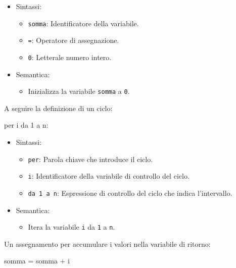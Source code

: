 \documentclass[
  letterpaper,
]{scrbook}
\newenvironment{Shaded}{\begin{snugshade}}{\end{snugshade}}
\newcommand{\NormalTok}[1]{\textcolor[rgb]{0.00,0.23,0.31}{#1}}
\providecommand{\tightlist}{%
  \setlength{\itemsep}{0pt}\setlength{\parskip}{0pt}}\usepackage{longtable,booktabs,array}
\begin{document}
\begin{itemize}
\tightlist
\item
  Sintassi:

  \begin{itemize}
  \tightlist
  \item
    \texttt{somma}: Identificatore della variabile.
  \item
    \texttt{=}: Operatore di assegnazione.
  \item
    \texttt{0}: Letterale numero intero.
  \end{itemize}
\item
  Semantica:

  \begin{itemize}
  \tightlist
  \item
    Inizializza la variabile \texttt{somma} a \texttt{0}.
  \end{itemize}
\end{itemize}

A seguire la definizione di un ciclo:

\begin{Shaded}
\begin{Highlighting}[]
\NormalTok{per i da 1 a n:}
\end{Highlighting}
\end{Shaded}

\begin{itemize}
\tightlist
\item
  Sintassi:

  \begin{itemize}
  \tightlist
  \item
    \texttt{per}: Parola chiave che introduce il ciclo.
  \item
    \texttt{i}: Identificatore della variabile di controllo del ciclo.
  \item
    \texttt{da\ 1\ a\ n}: Espressione di controllo del ciclo che indica
    l'intervallo.
  \end{itemize}
\item
  Semantica:

  \begin{itemize}
  \tightlist
  \item
    Itera la variabile \texttt{i} da \texttt{1} a \texttt{n}.
  \end{itemize}
\end{itemize}

Un assegnamento per accumulare i valori nella variabile di ritorno:

\begin{Shaded}
\begin{Highlighting}[]
\NormalTok{somma = somma + i}
\end{Highlighting}
\end{Shaded}
\end{document}
